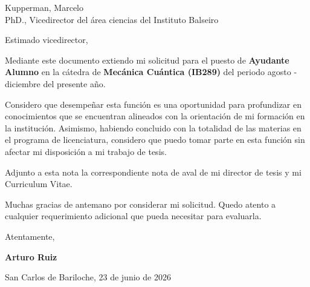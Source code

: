 \documentclass[11pt]{letter}
\date{}
\begin{document}
\begin{letter}{Kupperman, Marcelo \\ PhD., Vicedirector del área ciencias del Instituto Balseiro}

\opening{Estimado vicedirector,}

Mediante este documento extiendo mi solicitud para el puesto de \textbf{Ayudante Alumno} en la cátedra de \textbf{Mecánica Cuántica (IB289)} del periodo agosto - diciembre del presente año.

Considero que desempeñar esta función es una oportunidad para profundizar en conocimientos que se encuentran alineados con la orientación de mi formación en la institución. Asimismo, habiendo concluido con la totalidad de las materias en el programa de licenciatura, considero que puedo tomar parte en esta función sin afectar mi disposición a mi trabajo de tesis.

Adjunto a esta nota la correspondiente nota de aval de mi director de tesis y mi Curriculum Vitae.

Muchas gracias de antemano por considerar mi solicitud. Quedo atento a cualquier requerimiento adicional que pueda necesitar para evaluarla.

\vspace{1cm}

\noindent Atentamente,

\vspace{1cm}

\begin{center}
    \textbf{Arturo Ruiz}
\end{center}

\vspace{0.3cm}

\noindent San Carlos de Bariloche, 23 de junio de 2026

\end{letter}
\end{document}

